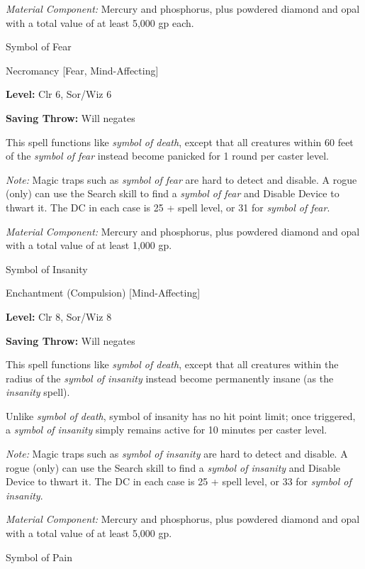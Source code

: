 \documentclass{article}
\begin{document}
\textit{Material Component: }Mercury and phosphorus, plus powdered diamond and 
opal with a total value of at least 5,000 gp each.

\vspace{12pt}
Symbol of Fear

Necromancy [Fear, Mind-Affecting]

\textbf{Level:} Clr 6, Sor/Wiz 6

\textbf{Saving Throw: }Will negates

This spell functions like \textit{symbol of death}, except that all creatures within 
60 feet of the \textit{symbol of fear }instead become panicked for 1 round per 
caster level.

\textit{Note: }Magic traps such as \textit{symbol of fear }are hard to detect and 
disable. A rogue (only) can use the Search skill to find a \textit{symbol of fear 
}and Disable Device to thwart it. The DC in each case is 25 + spell level, or 31 
for \textit{symbol of fear}.

\textit{Material Component: }Mercury and phosphorus, plus powdered diamond and 
opal with a total value of at least 1,000 gp.

\vspace{12pt}
Symbol of Insanity

Enchantment (Compulsion) [Mind-Affecting]

\textbf{Level:} Clr 8, Sor/Wiz 8

\textbf{Saving Throw: }Will negates

This spell functions like \textit{symbol of death}, except that all creatures within 
the radius of the \textit{symbol of insanity }instead become permanently insane 
(as the \textit{insanity }spell).

Unlike \textit{symbol of death}, symbol of insanity has no hit point limit; once 
triggered, a \textit{symbol of insanity }simply remains active for 10 minutes per 
caster level.

\textit{Note: }Magic traps such as \textit{symbol of insanity }are hard to detect 
and disable. A rogue (only) can use the Search skill to find a \textit{symbol of 
insanity }and Disable Device to thwart it. The DC in each case is 25 + spell level, 
or 33 for \textit{symbol of insanity}.

\textit{Material Component: }Mercury and phosphorus, plus powdered diamond and 
opal with a total value of at least 5,000 gp.

\vspace{12pt}
Symbol of Pain
\end{document}
